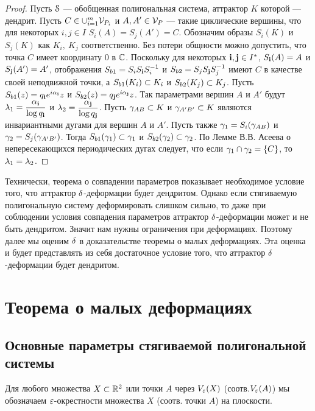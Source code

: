 \begin{proof}
Пусть ${\EuScript S}$ --- обобщенная полигональная система, аттрактор $K$ которой --- дендрит. 
Пусть $C \in\cup_{i=1}^m  {\mathcal V}_{P_i}$ и $A,A'\in {\mathcal V}_P$ --- такие циклические вершины, что для некоторых $i,j\in I$  $S_i(A)=S_j(A')=C$. 
Обозначим образы $S_i(K)$ и $S_j(K)$ как $K_i,\ K_j$ соответственно. 
Без потери общности можно допустить, что точка $C$ имеет координату $0$ в $\mathbb{C}$. 
Поскольку для некоторых ${\bf{i}},{\bf{j}}\in I^*$, $S_{\bf{i}}(A)=A$ и $S_{\bf{j}}(A')=A'$, отображения $S_{b1}=S_iS_{\bf{i}} S_i^{-1}$ и $S_{b2}=S_jS_{\bf{j}} S_j^{-1}$ имеют $C$  в качестве своей неподвижной точки, а $S_{b1}(K_i)\subset K_i$ и $S_{b2}(K_j)\subset K_j$. 
Пусть $S_{b1}(z)=q_{\bf{i}} e^{i\alpha_{\bf{i}}}z$ и $S_{b2}(z)=q_{\bf{j}} e^{i\alpha_{\bf{j}}}z$. 
Так параметрами вершин $A$ и $A'$ будут $\lambda_1=\dfrac{\alpha_{\bf{i}}}{\log q_{\bf{i}}}$ и  $\lambda_2=\dfrac{\alpha_{\bf{j}}}{\log q_{\bf{j}}}$. 
Пусть $\gamma_{AB}\subset K$ и $\gamma_{A'B'}\subset K$ являются инвариантными дугами для вершин $A$ и $A'$. 
Пусть также  $\gamma_1=S_i(\gamma_{AB})$ и $\gamma_2=S_j(\gamma_{A'B'})$. 
Тогда $S_{b1}(\gamma_1)\subset \gamma_1$ и $S_{b2}(\gamma_2)\subset \gamma_2$. 
По Лемме В.В. Асеева о непересекающихся периодических дугах \cite[Lemma 3.1]{ATK} следует, что если $\gamma_1\cap\gamma_2=\{C\}$, то $\lambda_1=\lambda_2$.
\end{proof}

Технически, теорема о совпадении параметров показывает необходимое условие того, что аттрактор $\delta$-деформации будет дендритом. 
Однако если стягиваемую полигональную систему деформировать слишком сильно, то даже при соблюдении условия совпадения параметров аттрактор $\delta$-деформации может и не быть дендритом. 
Значит нам нужны ограничения при деформациях. 
Поэтому далее мы оценим $\delta$ в доказательстве теоремы о малых деформациях. 
Эта оценка и будет представлять из себя достаточное условие того, что аттрактор $\delta$-деформации будет дендритом.



\section{Теорема о малых деформациях}

\subsection{Основные параметры стягиваемой полигональной системы}\label{parms}

Для любого множества $X\subset\mathbb{R}^2$ или точки $A$ через $V_\varepsilon(X)$ (соотв.$V_\varepsilon(A)$) мы обозначаем $\varepsilon$-окрестности множества $X$ (соотв. точки $A$) на плоскости.\\

